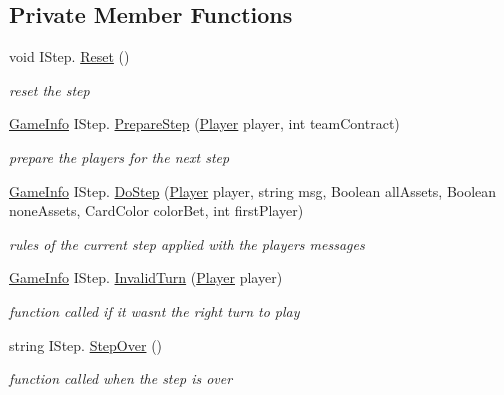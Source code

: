 \subsection*{Private Member Functions}
\begin{DoxyCompactItemize}
\item 
void I\+Step. \hyperlink{class_coinche_1_1_announce_a0fddda733e5f081be1091b2c67279982}{Reset} ()
\begin{DoxyCompactList}\small\item\em reset the step \end{DoxyCompactList}\item 
\hyperlink{class_coinche_1_1_tools_1_1_game_info}{Game\+Info} I\+Step. \hyperlink{class_coinche_1_1_announce_a24398cfbd8280465732c360858e72e13}{Prepare\+Step} (\hyperlink{class_coinche_1_1_player}{Player} player, int team\+Contract)
\begin{DoxyCompactList}\small\item\em prepare the players for the next step \end{DoxyCompactList}\item 
\hyperlink{class_coinche_1_1_tools_1_1_game_info}{Game\+Info} I\+Step. \hyperlink{class_coinche_1_1_announce_acf172bfff869b6e3f63ac4a18de63a55}{Do\+Step} (\hyperlink{class_coinche_1_1_player}{Player} player, string msg, Boolean all\+Assets, Boolean none\+Assets, Card\+Color color\+Bet, int first\+Player)
\begin{DoxyCompactList}\small\item\em rules of the current step applied with the players messages \end{DoxyCompactList}\item 
\hyperlink{class_coinche_1_1_tools_1_1_game_info}{Game\+Info} I\+Step. \hyperlink{class_coinche_1_1_announce_a778b04cb7ff3405d1a182e445a7c8f4c}{Invalid\+Turn} (\hyperlink{class_coinche_1_1_player}{Player} player)
\begin{DoxyCompactList}\small\item\em function called if it wasn\textquotesingle{}t the right turn to play \end{DoxyCompactList}\item 
string I\+Step. \hyperlink{class_coinche_1_1_announce_a3337d94429e31a70eb66ee0be3714e86}{Step\+Over} ()
\begin{DoxyCompactList}\small\item\em function called when the step is over \end{DoxyCompactList}\end{DoxyCompactItemize}
